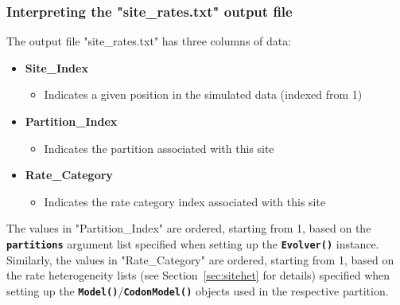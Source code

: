 \documentclass{article}
\newcommand{\code}[1]{\textbf{\texttt{\small{#1}}}}
\begin{document}
\subsubsection{Interpreting the "site\_rates.txt" output file}\label{sec:ratefile}
The output file "site\_rates.txt" has three columns of data:
\begin{itemize}
	\item \textbf{Site\_Index}
	\begin{itemize}
		\item Indicates a given position in the simulated data (indexed from 1)
	\end{itemize}
	\item \textbf{Partition\_Index}
	\begin{itemize}
		\item Indicates the partition associated with this site
	\end{itemize}
	\item \textbf{Rate\_Category}
	\begin{itemize}
		\item Indicates the rate category index associated with this site
	\end{itemize}
\end{itemize}


The values in "Partition\_Index" are ordered, starting from 1, based on the \code{partitions} argument list specified when setting up the \code{Evolver()} instance. Similarly, the values in "Rate\_Category" are ordered, starting from 1, based on the rate heterogeneity lists (see Section~\ref{sec:sitehet} for details) specified when setting up the \code{Model()}/\code{CodonModel()} objects used in the respective partition.
\end{document}
